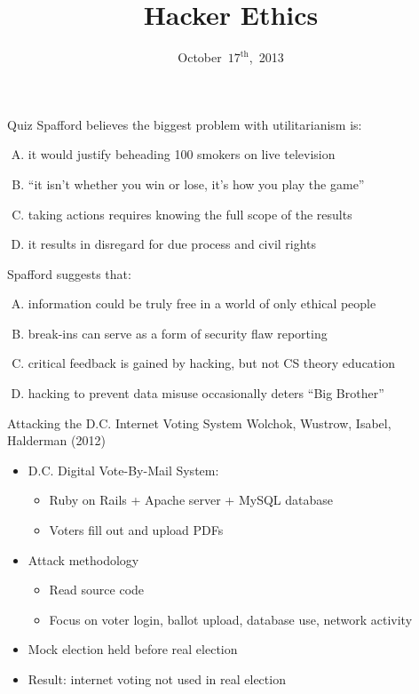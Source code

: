\documentclass{beamer}
\title{Hacker Ethics}
\date{October~$17^{\text{th}}$,~2013}
\begin{document}
\begin{frame}
\titlepage
\end{frame}

\begin{frame}{Quiz}
Spafford believes the biggest problem with utilitarianism is:
\begin{enumerate}[(A)]
\item<1> it would justify beheading 100 smokers on live television
\item<1> ``it isn't whether you win or lose, it's how you play the game''
\item<1-2> taking actions requires knowing the full scope of the results
\item<1> it results in disregard for due process and civil rights
\end{enumerate}
\bigskip
Spafford suggests that:
\begin{enumerate}[(A)]
\item<1-2> information could be truly free in a world of only ethical people
\item<1> break-ins can serve as a form of security flaw reporting %
\item<1> critical feedback is gained by hacking, but not CS theory education %
\item<1> hacking to prevent data misuse occasionally deters ``Big Brother''
\end{enumerate}
\end{frame}

\begin{frame}{Attacking the D.C. Internet Voting System}
Wolchok, Wustrow, Isabel, Halderman (2012)
\begin{itemize}
\item D.C. Digital Vote-By-Mail System:
\begin{itemize}
\item Ruby on Rails + Apache server + MySQL database
\item Voters fill out and upload PDFs
\end{itemize}
\item Attack methodology
\begin{itemize}
\item Read source code
\item Focus on voter login, ballot upload, database use, network activity
\end{itemize}
\item Mock election held before real election
\item Result: internet voting not used in real election
\end{itemize}
\end{frame}
\end{document}
